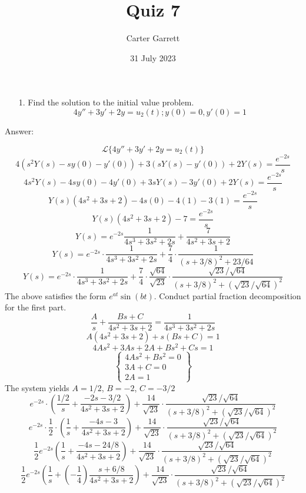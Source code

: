 \documentclass{article}
\title{Quiz 7}
\author{Carter Garrett}
\date{31 July 2023}
\begin{document}
\maketitle

\begin{enumerate}
    \item [1.]
    Find the solution to the initial value problem.
    $$4y'' + 3y' + 2y = u_2(t); y(0) = 0, y'(0) = 1$$

\end{enumerate}

Answer:

    \begin{center}
        $$\mathcal{L}\{4y'' + 3y' + 2y = u_2(t)\}$$
        $$4(s^2Y(s) - sy(0) - y'(0)) + 3(sY(s) - y'(0)) + 2Y(s) = \dfrac{e^{-2s}}{s}$$
        $$4s^2Y(s) - 4sy(0) - 4y'(0) + 3sY(s) - 3y'(0) + 2Y(s) = \dfrac{e^{-2s}}{s}$$
        $$Y(s)(4s^2 +3s + 2) - 4s(0) - 4(1) -3(1) = \dfrac{e^{-2s}}{s}$$
        $$Y(s)(4s^2 + 3s + 2) - 7 = \dfrac{e^{-2s}}{s}$$ 
        $$Y(s) = e^{-2s} \dfrac{1}{4s^3 + 3s^2 + 2s} + \dfrac{7}{4s^2 + 3s + 2}$$
        $$Y(s) = e^{-2s} \cdot \dfrac{1}{4s^3 + 3s^2 + 2s} + \dfrac{7}{4}\cdot \dfrac{1}{(s + 3/8)^2 + 23/64}$$
        $$Y(s) = e^{-2s} \cdot \dfrac{1}{4s^3 + 3s^2 + 2s}  + \dfrac{7}{4} \cdot \dfrac{\sqrt{64}}{\sqrt{23}} \cdot \dfrac{\sqrt{23}/\sqrt{64}}{(s + 3/8)^2 + (\sqrt{23}/\sqrt{64})^2}$$
        The above satisfies the form $e^{at}\sin(bt)$. Conduct partial fraction decomposition for the first part.
        $$\dfrac{A}{s} + \dfrac{Bs + C}{4s^2 + 3s + 2} = \dfrac{1}{4s^3 + 3s^2 + 2s}$$
        $$A(4s^2 + 3s + 2) + s(Bs + C) = 1$$
        $$4As^2 + 3As + 2A + Bs^2 + Cs = 1$$
        $$\begin{Bmatrix}
            4As^2 + Bs^2 = 0 \\
            3A + C = 0 \\
            2A = 1 
        \end{Bmatrix}$$
        The system yields $ A = 1/2$, $B = -2 $, $C = -3/2$
        $$e^{-2s} \cdot (\dfrac{1/2}{s} + \dfrac{-2s - 3/2}{4s^2 + 3s + 2}) + \dfrac{14}{\sqrt{23}}\cdot\dfrac{\sqrt{23}/\sqrt{64}}{(s + 3/8)^2 + (\sqrt{23}/\sqrt{64})^2}$$
        $$e^{-2s}\cdot \dfrac{1}{2}\cdot (\dfrac{1}{s} + \dfrac{-4s - 3}{4s^2 + 3s +2}) + \dfrac{14}{\sqrt{23}}\cdot\dfrac{\sqrt{23}/\sqrt{64}}{(s + 3/8)^2 + (\sqrt{23}/\sqrt{64})^2}$$
        $$\dfrac{1}{2}e^{-2s}(\dfrac{1}{s} + \dfrac{-4s - 24/8}{4s^2 + 3s + 2}) + \dfrac{14}{\sqrt{23}}\cdot\dfrac{\sqrt{23}/\sqrt{64}}{(s + 3/8)^2 + (\sqrt{23}/\sqrt{64})^2}$$
        $$\dfrac{1}{2}e^{-2s}(\dfrac{1}{s} +(-\dfrac{1}{4})\dfrac{s + 6/8}{4s^2 + 3s + 2}) + \dfrac{14}{\sqrt{23}}\cdot\dfrac{\sqrt{23}/\sqrt{64}}{(s + 3/8)^2 + (\sqrt{23}/\sqrt{64})^2}$$

\end{center}
\end{document}
